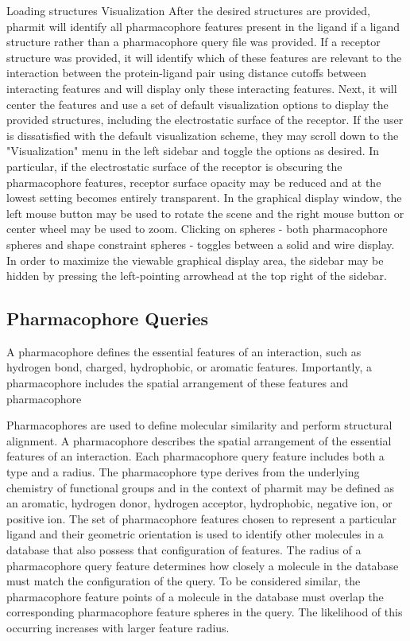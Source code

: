 Loading structures
Visualization
After the desired structures are provided, pharmit will identify all pharmacophore features present in the ligand if a ligand structure rather than a pharmacophore query file was provided. If a receptor structure was provided, it will identify which of these features are relevant to the interaction between the protein-ligand pair using distance cutoffs between interacting features and will display only these interacting features. Next, it will center the features and use a set of default visualization options to display the provided structures, including the electrostatic surface of the receptor. If the user is dissatisfied with the default visualization scheme, they may scroll down to the "Visualization" menu in the left sidebar and toggle the options as desired. In particular, if the electrostatic surface of the receptor is obscuring the pharmacophore features, receptor surface opacity may be reduced and at the lowest setting becomes entirely transparent. In the graphical display window, the left mouse button may be used to rotate the scene and the right mouse button or center wheel may be used to zoom. Clicking on spheres - both pharmacophore spheres and shape constraint spheres - toggles between a solid and wire display. In order to maximize the viewable graphical display area, the sidebar may be hidden by pressing the left-pointing arrowhead at the top right of the sidebar.


\subsection{Pharmacophore Queries}
A pharmacophore \cite{Koes_2015rev,Yang_2010,Leach_2010} defines the essential features of an interaction, such as hydrogen bond, charged, hydrophobic, or aromatic features. Importantly, a pharmacophore includes the spatial arrangement of these features and pharmacophore


Pharmacophores are used to define molecular similarity and perform structural alignment. A pharmacophore describes the spatial arrangement of the essential features of an interaction. Each pharmacophore query feature includes both a type and a radius. The pharmacophore type derives from the underlying chemistry of functional groups and in the context of pharmit may be defined as an aromatic, hydrogen donor, hydrogen acceptor, hydrophobic, negative ion, or positive ion. The set of pharmacophore features chosen to represent a particular ligand and their geometric orientation is used to identify other molecules in a database that also possess that configuration of features. The radius of a pharmacophore query feature determines how closely a molecule in the database must match the configuration of the query. To be considered similar, the pharmacophore feature points of a molecule in the database must overlap the corresponding pharmacophore feature spheres in the query. The likelihood of this occurring increases with larger feature radius.

